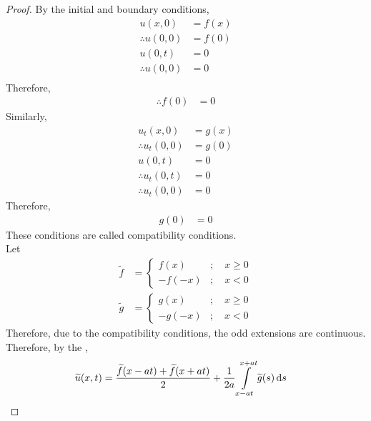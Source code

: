 \documentclass[titlepage, fleqn, a4paper, 12pt, twoside]{article}
\theoremstyle{definition}
\theoremstyle{theorem}
\renewcommand{\tilde}{\widetilde}
\begin{document}
\begin{proof}
	By the initial and boundary conditions,
	\begin{align*}
		u(x,0) &= f(x)\\
		\therefore u(0,0) &= f(0)\\
		u(0,t) &= 0\\
		\therefore u(0,0) &= 0\\
	\end{align*}
	Therefore,
	\begin{align*}
		\therefore f(0) &= 0
	\end{align*}
	Similarly,
	\begin{align*}
		u_t(x,0) &= g(x)\\
		\therefore u_t(0,0) &= g(0)\\
		u(0,t) &= 0\\
		\therefore u_t(0,t) &= 0\\
		\therefore u_t(0,0) &= 0
	\end{align*}
	Therefore,
	\begin{align*}
		g(0) &= 0
	\end{align*}
	These conditions are called compatibility conditions.\\
	Let
	\begin{align*}
		\tilde{f} &=
			\begin{cases}
				f(x) &;\quad x \ge 0\\
				-f(-x) &;\quad x < 0
			\end{cases}\\
		\tilde{g} &=
			\begin{cases}
				g(x) &;\quad x \ge 0\\
				-g(-x) &;\quad x < 0
			\end{cases}
	\end{align*}
	Therefore, due to the compatibility conditions, the odd extensions are continuous.\\
	Therefore, by the ,
	\begin{align*}
		\tilde{u}(x,t) &= \frac{\tilde{f}(x - a t) + \tilde{f}(x + a t)}{2} + \frac{1}{2 a} \int\limits_{x - a t}^{x + a t} \tilde{g}(s) \dif s
	\end{align*}
\end{proof}
\end{document}
